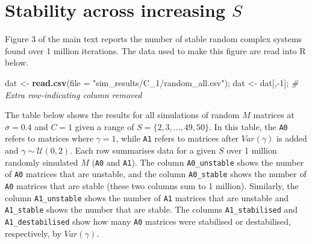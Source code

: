 \documentclass[]{article}
\newenvironment{Shaded}{\begin{snugshade}}{\end{snugshade}}
\newcommand{\KeywordTok}[1]{\textcolor[rgb]{0.13,0.29,0.53}{\textbf{{#1}}}}
\newcommand{\DataTypeTok}[1]{\textcolor[rgb]{0.13,0.29,0.53}{{#1}}}
\newcommand{\DecValTok}[1]{\textcolor[rgb]{0.00,0.00,0.81}{{#1}}}
\newcommand{\StringTok}[1]{\textcolor[rgb]{0.31,0.60,0.02}{{#1}}}
\newcommand{\CommentTok}[1]{\textcolor[rgb]{0.56,0.35,0.01}{\textit{{#1}}}}
\newcommand{\NormalTok}[1]{{#1}}
\begin{document}
\hypertarget{IncrS}{\section{\texorpdfstring{Stability across increasing
\(S\)}{Stability across increasing S}}\label{IncrS}}

Figure 3 of the main text reports the number of stable random complex
systems found over 1 million iterations. The data used to make this
figure are read into R below.

\begin{Shaded}
\begin{Highlighting}[]
\NormalTok{dat <-}\StringTok{ }\KeywordTok{read.csv}\NormalTok{(}\DataTypeTok{file =} \StringTok{"sim_results/C_1/random_all.csv"}\NormalTok{);}
\NormalTok{dat <-}\StringTok{ }\NormalTok{dat[,-}\DecValTok{1}\NormalTok{]; }\CommentTok{# Extra row-indicating column removed}
\end{Highlighting}
\end{Shaded}

The table below shows the results for all simulations of random \(M\)
matrices at \(\sigma = 0.4\) and \(C = 1\) given a range of
\(S = \{2, 3, ..., 49, 50\}\). In this table, the \texttt{A0} refers to
matrices where \(\gamma = 1\), while \texttt{A1} refers to matrices
after \(Var(\gamma)\) is added and \(\gamma \sim \mathcal{U}(0, 2)\).
Each row summarises data for a given \(S\) over 1 million randomly
simulated \(M\) (\texttt{A0} and \texttt{A1}). The column
\texttt{A0\_unstable} shows the number of \texttt{A0} matrices that are
unstable, and the column \texttt{A0\_stable} shows the number of
\texttt{A0} matrices that are stable (these two columns sum to 1
million). Similarly, the column \texttt{A1\_unstable} shows the number
of \texttt{A1} matrices that are unstable and \texttt{A1\_stable} shows
the number that are stable. The columns \texttt{A1\_stabilised} and
\texttt{A1\_destabilised} show how many \texttt{A0} matrices were
stabilised or destabilised, respectively, by \(Var(\gamma)\).
\end{document}
